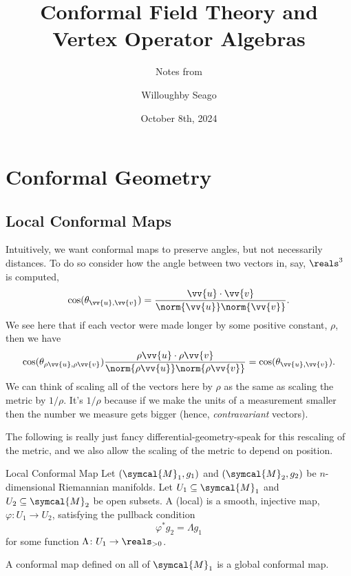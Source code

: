 \documentclass[fleqn]{NotesClass}
\title{Conformal Field Theory and Vertex Operator Algebras}
\author{Willoughby Seago}
\date{October 8th, 2024}
\subtitle{Notes from}
\newcommand{\manifold}{\symcal{M}}
\begin{document}
    \frontmatter
    \titlepage
    \innertitlepage{}
    \tableofcontents
    \mainmatter
    \chapter{Conformal Geometry}
    \section{Local Conformal Maps}
    Intuitively, we want conformal maps to preserve angles, but not necessarily distances.
    To do so consider how the angle between two vectors in, say, \(\reals^3\) is computed,
    \begin{equation}
        \cos(\theta_{\vv{u}, \vv{v}}) = \frac{\vv{u} \cdot \vv{v}}{\norm{\vv{u}} \norm{\vv{v}}} .
    \end{equation}
    We see here that if each vector were made longer by some positive constant, \(\rho\), then we have
    \begin{equation}
        \cos(\theta_{\rho \vv{u}, \rho \vv{v}})\frac{\rho \vv{u} \cdot \rho \vv{v}}{\norm{\rho \vv{u}} \norm{\rho \vv{v}}} = \cos(\theta_{\vv{u}, \vv{v}}).
    \end{equation}
    We can think of scaling all of the vectors here by \(\rho\) as the same as scaling the metric by \(1/\rho\).
    It's \(1/\rho\) because if we make the units of a measurement smaller then the number we measure gets bigger (hence, \emph{contravariant} vectors).
    
    The following is really just fancy differential-geometry-speak for this rescaling of the metric, and we also allow the scaling of the metric to depend on position.
    
    \begin{dfn}{Local Conformal Map}{}
        Let \((\manifold_1, g_1)\) and \((\manifold_2, g_2)\) be \(n\)-dimensional Riemannian manifolds.
        Let \(U_1 \subseteq \manifold_1\) and \(U_2 \subseteq \manifold_2\) be open subsets.
        A (local)  is a smooth, injective map, \(\varphi \colon U_1 \to U_2\), satisfying the pullback condition
        \begin{equation}
            \varphi^*g_2 = \Lambda g_1
        \end{equation}
        for some function \(\Lambda \colon U_1 \to \reals_{>0}\).
        
        A conformal map defined on all of \(\manifold_1\) is a global conformal map.
    \end{dfn}
    
\end{document}
